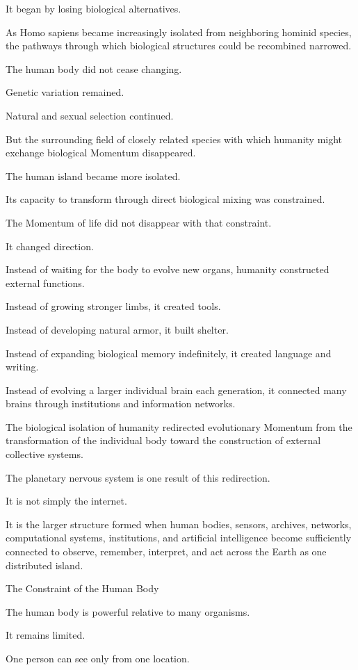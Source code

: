 It began by losing biological alternatives.

As Homo sapiens became increasingly isolated from neighboring hominid species, the pathways through which biological structures could be recombined narrowed.

The human body did not cease changing.

Genetic variation remained.

Natural and sexual selection continued.

But the surrounding field of closely related species with which humanity might exchange biological Momentum disappeared.

The human island became more isolated.

Its capacity to transform through direct biological mixing was constrained.

The Momentum of life did not disappear with that constraint.

It changed direction.

Instead of waiting for the body to evolve new organs, humanity constructed external functions.

Instead of growing stronger limbs, it created tools.

Instead of developing natural armor, it built shelter.

Instead of expanding biological memory indefinitely, it created language and writing.

Instead of evolving a larger individual brain each generation, it connected many brains through institutions and information networks.

The biological isolation of humanity redirected evolutionary Momentum from the transformation of the individual body toward the construction of external collective systems.

The planetary nervous system is one result of this redirection.

It is not simply the internet.

It is the larger structure formed when human bodies, sensors, archives, networks, computational systems, institutions, and artificial intelligence become sufficiently connected to observe, remember, interpret, and act across the Earth as one distributed island.

The Constraint of the Human Body

The human body is powerful relative to many organisms.

It remains limited.

One person can see only from one location.

